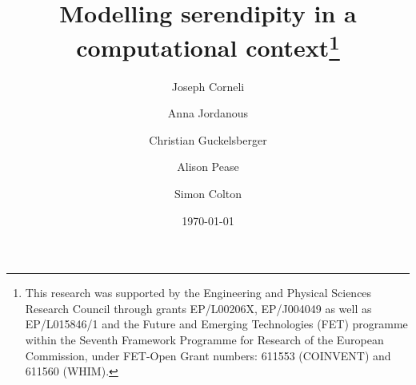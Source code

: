 \documentclass[smallextended,natbib]{svjour3} %
\theoremstyle{named}
\begin{document}
\title{Modelling serendipity in a computational context\thanks{This research was supported by the Engineering and Physical Sciences Research Council through grants EP/L00206X, EP/J004049 as well as EP/L015846/1 and the Future and Emerging Technologies (FET) programme within the Seventh Framework Programme for Research of the European Commission, under FET-Open Grant numbers: 611553 (COINVENT) and 611560 (WHIM).}}
\author{Joseph Corneli \and  Anna Jordanous \and Christian Guckelsberger \and Alison Pease \and Simon Colton}
\date{\today}

\authorrunning{~}

\maketitle



\bigskip

\maketitle


\setcounter{footnote}{0}














% 
\end{document}
